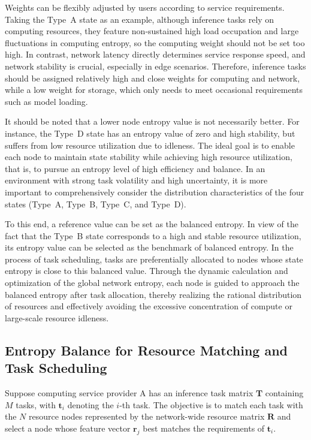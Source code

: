 \documentclass{ccjnl}
\begin{document}
Weights can be flexibly adjusted by users according to service requirements. Taking the Type~A state as an example, although inference tasks rely on computing resources, they feature non-sustained high load occupation and large fluctuations in computing entropy, so the computing weight should not be set too high. In contrast, network latency directly determines service response speed, and network stability is crucial, especially in edge scenarios. Therefore, inference tasks should be assigned relatively high and close weights for computing and network, while a low weight for storage, which only needs to meet occasional requirements such as model loading.

It should be noted that a lower node entropy value is not necessarily better. For instance, the Type~D state has an entropy value of zero and high stability, but suffers from low resource utilization due to idleness. The ideal goal is to enable each node to maintain state stability while achieving high resource utilization, that is, to pursue an entropy level of high efficiency and balance. In an environment with strong task volatility and high uncertainty, it is more important to comprehensively consider the distribution characteristics of the four states (Type~A, Type~B, Type~C, and Type~D).

To this end, a reference value can be set as the balanced entropy. In view of the fact that the Type~B state corresponds to a high and stable resource utilization, its entropy value can be selected as the benchmark of balanced entropy. In the process of task scheduling, tasks are preferentially allocated to nodes whose state entropy is close to this balanced value. Through the dynamic calculation and optimization of the global network entropy, each node is guided to approach the balanced entropy after task allocation, thereby realizing the rational distribution of resources and effectively avoiding the excessive concentration of compute or large-scale resource idleness.

\subsection{Entropy Balance for Resource Matching and Task Scheduling}
\label{s3-5}

Suppose computing service provider A has an inference task matrix $\mathbf{T}$ containing $M$ tasks, with $\mathbf{t}_i$ denoting the $i$-th task. The objective is to match each task with the $N$ resource nodes represented by the network-wide resource matrix $\mathbf{R}$ and select a node whose feature vector $\mathbf{r}_j$ best matches the requirements of $\mathbf{t}_i$.
\end{document}
